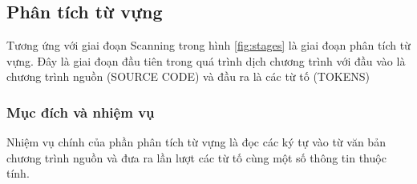 \subsection{Phân tích từ vựng}

Tương ứng với giai đoạn Scanning trong hình \ref{fig:stages} là giai đoạn phân tích từ vựng. Đây là giai đoạn đầu tiên trong quá trình dịch chương trình với đầu vào là chương trình nguồn (SOURCE CODE) và đầu ra là các từ tố (TOKENS)

\subsubsection{Mục đích và nhiệm vụ}
Nhiệm vụ chính của phần phân tích từ vựng là đọc các ký tự vào từ văn bản chương trình nguồn và đưa ra lần lượt các từ tố cùng một số thông tin thuộc tính.

    


